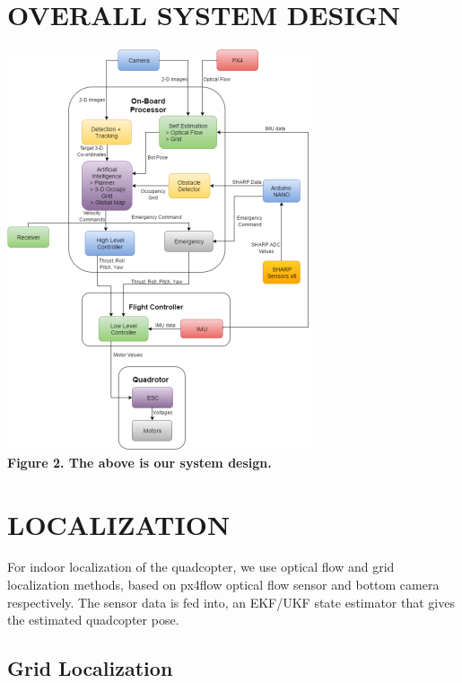 \documentclass[12pt]{article}
\begin{document}
\section{OVERALL SYSTEM DESIGN}
\begin{center}\includegraphics{image22} \\
\textbf{Figure 2. The above is our system design.}\end{center}

\section{LOCALIZATION}
For indoor localization of the quadcopter, we use optical flow and grid localization methods, 
based on px4flow optical flow sensor and bottom camera respectively. The sensor data is fed into, 
an EKF/UKF state estimator that gives the estimated quadcopter pose.

\subsection{Grid Localization}
\end{document}
